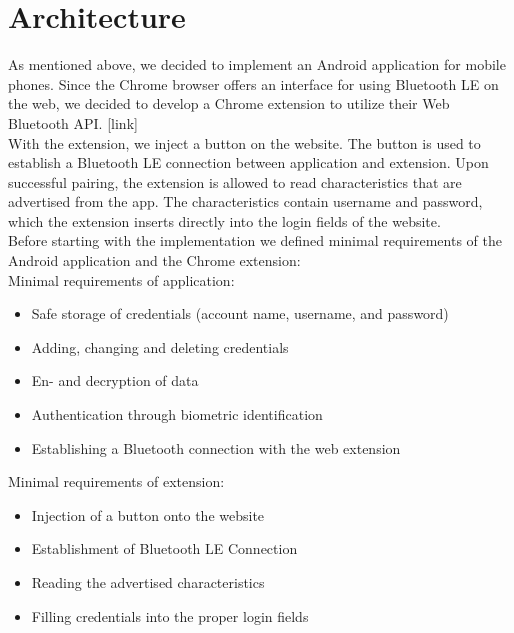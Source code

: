\section{Architecture}
\label{architecture}

As mentioned above, we decided to implement an Android application for mobile phones. Since the Chrome browser offers an interface for using Bluetooth LE on the web, we decided to develop a Chrome extension to utilize their Web Bluetooth API. [link] \\

With the extension, we inject a button on the website. The button is used to establish a Bluetooth LE connection between application and extension. Upon successful pairing, the extension is allowed to read characteristics that are advertised from the app. The characteristics contain username and password, which the extension inserts directly into the login fields of the website. \\

\noindent Before starting with the implementation we defined minimal requirements of the Android application and the Chrome extension: \\

\noindent Minimal requirements of application:
\begin{itemize}
\item Safe storage of credentials (account name, username, and password)
\item Adding, changing and deleting credentials
\item En- and decryption of data 
\item Authentication through biometric identification
\item Establishing a Bluetooth connection with the web extension
\end{itemize}
\vspace{0.3cm}
\noindent Minimal requirements of extension:
\begin{itemize}
\item Injection of a button onto the website
\item Establishment of Bluetooth LE Connection
\item Reading the advertised characteristics
\item Filling credentials into the proper login fields
\end{itemize}



